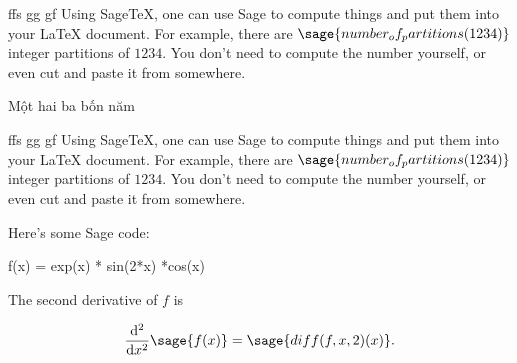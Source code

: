 \documentclass[12pt]{article}
\begin{document}
\sdd


\newpage{}


ffs gg gf
Using Sage\TeX, one can use Sage to compute things and put them into
your \LaTeX{}  document. For example, there are
$\sage{number_of_partitions(1234)} $ integer partitions of $1234$.
You don't need to compute the number yourself, or even cut and paste
it from somewhere.

Một hai ba bốn năm
% 
% 


\newpage{}

ffs gg gf
Using Sage\TeX, one can use Sage to compute things and put them into
your \LaTeX{}  document. For example, there are
$\sage{number_of_partitions(1234)} $ integer partitions of $1234$.
You don't need to compute the number yourself, or even cut and paste
it from somewhere.

Here's some  Sage code:

\begin{sageblock} 
    f(x) = exp(x) * sin(2*x) *cos(x)
\end{sageblock} 

The second derivative of $f$ is

\begin{align}
  \frac{ \mathrm{ d} ^{ 2} } { \mathrm{ d} x^{ 2} }  \sage{f(x)}  =
  \sage{diff(f, x, 2)(x)} .
\end{align}

% 


\newpage{}

\end{document}

